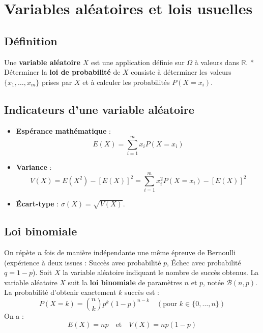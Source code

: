 \documentclass{article}
\begin{document}
	\section{Variables aléatoires et lois usuelles}
	
	\subsection{Définition}
	Une \textbf{variable aléatoire} $X$ est une application définie sur $\Omega$ à valeurs dans $\mathbb{R}$.
	* Déterminer la \textbf{loi de probabilité} de $X$ consiste à déterminer les valeurs $\{x_1, \dots, x_m\}$ prises par $X$ et à calculer les probabilités $P(X = x_i)$.
	
	\subsection{Indicateurs d'une variable aléatoire}
	\begin{itemize}
		\item \textbf{Espérance mathématique} :
		\[ E(X) = \sum_{i=1}^m x_i P(X = x_i) \]
		\item \textbf{Variance} :
		\[ V(X) = E(X^2) - [E(X)]^2 = \sum_{i=1}^m x_i^2 P(X = x_i) - [E(X)]^2 \]
		\item \textbf{Écart-type} : $\sigma(X) = \sqrt{V(X)}$.
	\end{itemize}
	
	\subsection{Loi binomiale}
	On répète $n$ fois de manière indépendante une même épreuve de Bernoulli (expérience à deux issues : Succès avec probabilité $p$, Échec avec probabilité $q = 1-p$).
	Soit $X$ la variable aléatoire indiquant le nombre de succès obtenus.
	La variable aléatoire $X$ suit la \textbf{loi binomiale} de paramètres $n$ et $p$, notée $\mathcal{B}(n, p)$.
	La probabilité d'obtenir exactement $k$ succès est :
	\[ P(X = k) = \binom{n}{k} p^k (1-p)^{n-k} \quad (\text{pour } k \in \{0, \dots, n\}) \]
	On a :
	\[ E(X) = np \quad \text{et} \quad V(X) = np(1-p) \]
	
\end{document}
